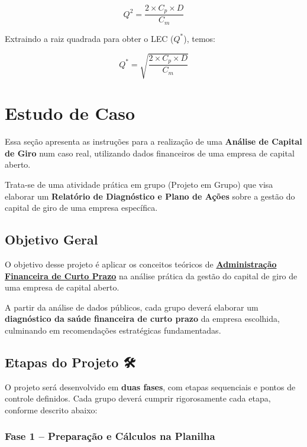 \documentclass[
  a4paper,
]{book}
\begin{document}
\[
Q^2 = \frac{2 \times C_p \times D}{C_m}
\]

Extraindo a raiz quadrada para obter o LEC (\(Q^*\)), temos:

\[
Q^* = \sqrt{\frac{2 \times C_p \times D}{C_m}}
\]


\chapter{Estudo de Caso}\label{sec-aval}

Essa seção apresenta as instruções para a realização de uma
\textbf{Análise de Capital de Giro} num caso real, utilizando dados
financeiros de uma empresa de capital aberto.

Trata-se de uma atividade prática em grupo (Projeto em Grupo) que visa
elaborar um \textbf{Relatório de Diagnóstico e Plano de Ações} sobre a
gestão do capital de giro de uma empresa específica.

\section{Objetivo Geral 🎯}\label{objetivo-geral}

O objetivo desse projeto é aplicar os conceitos teóricos de
\hyperref[sec-giro]{\textbf{Administração Financeira de Curto Prazo}} na
análise prática da gestão do capital de giro de uma empresa de capital
aberto.

A partir da análise de dados públicos, cada grupo deverá elaborar um
\textbf{diagnóstico da saúde financeira de curto prazo} da empresa
escolhida, culminando em recomendações estratégicas fundamentadas.

\section{Etapas do Projeto 🛠}\label{etapas-do-projeto}

O projeto será desenvolvido em \textbf{duas fases}, com etapas
sequenciais e pontos de controle definidos. Cada grupo deverá cumprir
rigorosamente cada etapa, conforme descrito abaixo:

\subsection{Fase 1 -- Preparação e Cálculos na Planilha
📌}\label{fase-1-preparauxe7uxe3o-e-cuxe1lculos-na-planilha}
\end{document}
